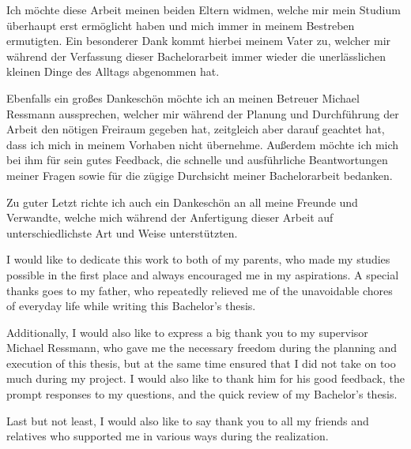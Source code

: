 \documentclass[draft,final]{vutinfth} %
\begin{document}
    \frontmatter %

    \addstatementpage

    \begin{danksagung*}
        Ich möchte diese Arbeit meinen beiden Eltern widmen, welche mir mein Studium überhaupt erst ermöglicht haben und mich immer in meinem Bestreben ermutigten.
        Ein besonderer Dank kommt hierbei meinem Vater zu, welcher mir während der Verfassung dieser Bachelorarbeit immer wieder die unerlässlichen kleinen Dinge des Alltags abgenommen hat.

        Ebenfalls ein großes Dankeschön möchte ich an meinen Betreuer Michael Ressmann aussprechen, welcher mir während der Planung und Durchführung der Arbeit den nötigen Freiraum gegeben hat, zeitgleich aber darauf geachtet hat, dass ich mich in meinem Vorhaben nicht übernehme.
        Außerdem möchte ich mich bei ihm für sein gutes Feedback, die schnelle und ausführliche Beantwortungen meiner Fragen sowie für die zügige Durchsicht meiner Bachelorarbeit bedanken.

        Zu guter Letzt richte ich auch ein Dankeschön an all meine Freunde und Verwandte, welche mich während der Anfertigung dieser Arbeit auf unterschiedlichste Art und Weise unterstützten.
    \end{danksagung*}

    \begin{acknowledgements*}
        I would like to dedicate this work to both of my parents, who made my studies possible in the first place and always encouraged me in my aspirations.
        A special thanks goes to my father, who repeatedly relieved me of the unavoidable chores of everyday life while writing this Bachelor's thesis.

        Additionally, I would also like to express a big thank you to my supervisor Michael Ressmann, who gave me the necessary freedom during the planning and execution of this thesis, but at the same time ensured that I did not take on too much during my project.
        I would also like to thank him for his good feedback, the prompt responses to my questions, and the quick review of my Bachelor's thesis.

        Last but not least, I would also like to say thank you to all my friends and relatives who supported me in various ways during the realization.
    \end{acknowledgements*}
\end{document}
